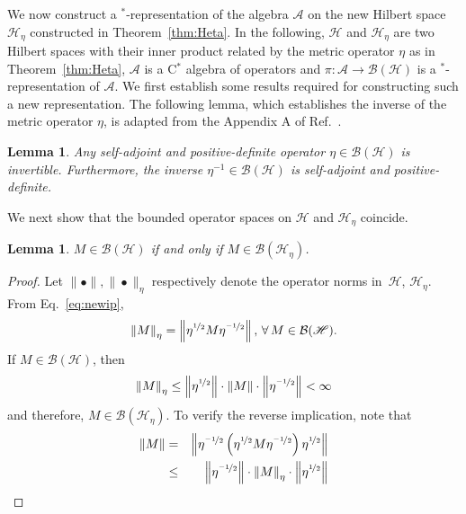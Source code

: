 \documentclass[amsmath,amssymb,aps,pra,superscriptaddress,twocolumn]{revtex4-2}
\newtheorem{lemma}[theorem]{Lemma}
\begin{document}
\begin{appendix}
We now construct a ${}^*$-representation of the algebra $\mathcal{A}$ on the new Hilbert space $\mathscr{H}_\eta$ constructed in Theorem~\ref{thm:Heta}.
In the following, $\mathscr{H}$ and $\mathscr{H}_\eta$ are two Hilbert spaces with their inner product related by
the metric operator $\eta$ as in Theorem~\ref{thm:Heta}, $\mathcal{A}$ is a C${}^*$ algebra of operators and
$\pi:\mathcal{A} \to \mathcal{B}(\mathscr{H})$ is a ${}^*$-representation of $\mathcal{A}$.
We first establish some results required for constructing such a new representation. The following lemma,
which establishes the inverse of the metric operator $\eta$, is adapted from the Appendix A of Ref.~\cite{SGH92}.
\begin{lemma}
Any self-adjoint and positive-definite operator $\eta \in \mathcal{B}(\mathscr{H})$
is invertible. 
Furthermore, the inverse $\eta^{-1}\in \mathcal{B}(\mathscr{H})$ is self-adjoint and positive-definite.
\end{lemma}
We next show that the bounded operator spaces on $\mathscr{H}$ and $\mathscr{H}_\eta$ coincide.
\begin{lemma}\label{lem:boundedopspaces}
    $M\in\mathcal{B}\left(\mathscr{H}\right)$ if and only if $M\in\mathcal{B}\left(\mathscr{H}_\eta\right)$.
\end{lemma}
\begin{proof}
    Let $\|\bullet\|,\|\bullet\|_\eta$ respectively denote the operator norms in~$\mathscr{H}$, $\mathscr{H}_\eta$.
    From Eq.~\eqref{eq:newip}, 
    \begin{equation}\label{eq:twonorms}
        \left\|M\right\|_\eta = \left\|\eta^{\nicefrac{1}{2}}M\eta^{\nicefrac{-1}{2}}\right\|,\, \forall\, M\in\mathcal{B}(\mathscr{H}).
    \end{equation}
    If $M\in \mathcal{B}\left(\mathscr{H}\right)$, then
    \begin{equation}
        \left\|M\right\|_\eta \leq \left\|\eta^{\nicefrac{1}{2}}\right\|\cdot\left\|M\right\|\cdot\left\|\eta^{\nicefrac{-1}{2}}\right\|<\infty
    \end{equation}
    and therefore, $M\in \mathcal{B}\left(\mathscr{H}_\eta\right)$. 
    To verify the reverse implication, note that
    \begin{eqnarray}
        \left\|M\right\| &=& \left\|\eta^{\nicefrac{-1}{2}}\left(\eta^{\nicefrac{1}{2}}M\eta^{\nicefrac{-1}{2}}\right)\eta^{\nicefrac{1}{2}}\right\|\nonumber \\
        &\leq & \left\|\eta^{\nicefrac{-1}{2}}\right\|\cdot \left\|M\right\|_\eta\cdot  \left\|\eta^{\nicefrac{1}{2}}\right\| 

\end{eqnarray}
\end{proof}
\end{appendix}
\end{document}
